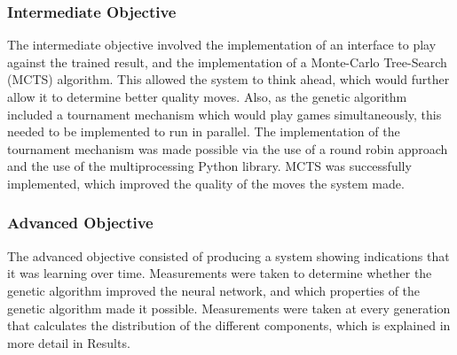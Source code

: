\documentclass[12pt,a4paper]{article}
\begin{document}
    \subsubsection{Intermediate Objective}
        The intermediate objective involved the implementation of an interface to play against the trained result, and the implementation of a Monte-Carlo Tree-Search (MCTS) algorithm. This allowed the system to think ahead, which would further allow it to determine better quality moves. Also, as the genetic algorithm included a tournament mechanism which would play games simultaneously, this needed to be implemented to run in parallel. The implementation of the tournament mechanism was made possible via the use of a round robin approach and the use of the multiprocessing Python library. MCTS was successfully implemented, which improved the quality of the moves the system made.
        
    \subsubsection{Advanced Objective}
        The advanced objective consisted of producing a system showing indications that it was learning over time. Measurements were taken to determine whether the genetic algorithm improved the neural network, and which properties of the genetic algorithm made it possible. Measurements were taken at every generation that calculates the distribution of the different components, which is explained in more detail in Results.
    
\end{document}
